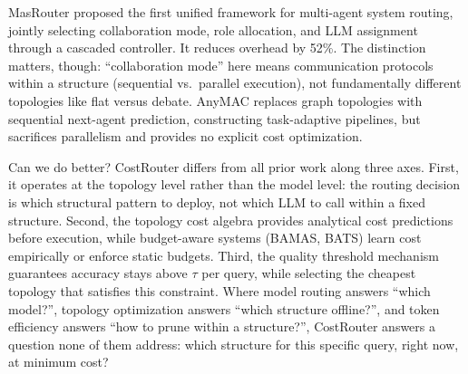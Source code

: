 MasRouter \cite{masrouter_2025} proposed the first unified framework for multi-agent system routing, jointly selecting collaboration mode, role allocation, and LLM assignment through a cascaded controller. It reduces overhead by 52\%. The distinction matters, though: ``collaboration mode'' here means communication protocols within a structure (sequential vs.~parallel execution), not fundamentally different topologies like flat versus debate. AnyMAC \cite{anymac_2025} replaces graph topologies with sequential next-agent prediction, constructing task-adaptive pipelines, but sacrifices parallelism and provides no explicit cost optimization.

Can we do better? CostRouter differs from all prior work along three axes. First, it operates at the topology level rather than the model level: the routing decision is which structural pattern to deploy, not which LLM to call within a fixed structure. Second, the topology cost algebra provides analytical cost predictions before execution, while budget-aware systems (BAMAS, BATS) learn cost empirically or enforce static budgets. Third, the quality threshold mechanism guarantees accuracy stays above \(\tau\) per query, while selecting the cheapest topology that satisfies this constraint. Where model routing answers ``which model?'', topology optimization answers ``which structure offline?'', and token efficiency answers ``how to prune within a structure?'', CostRouter answers a question none of them address: which structure for this specific query, right now, at minimum cost?

